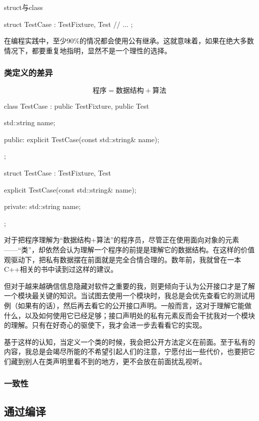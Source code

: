 \begin{content}
\begin{episode}{struct与class}
\begin{content}
\begin{c++}
struct TestCase : TestFixture, Test {
  // ...  
};
\end{c++}

在编程实践中，至少$90\%$的情况都会使用公有继承。这就意味着，如果在绝大多数情况下，都要重复地指明，显然不是一个理性的选择。

\subsubsection{类定义的差异}

\[\text{程序} = \text{数据结构} + \text{算法}\]

\begin{c++}
class TestCase : public TestFixture, public Test {
  std::string name;

public:
  explicit TestCase(const std::string& name);
};

struct TestCase : TestFixture, Test {
  explicit TestCase(const std::string& name);

private:
  std::string name;
};
\end{c++}

对于把程序理解为“数据结构+算法”的程序员，尽管正在使用面向对象的元素——“类”，却依然会认为理解一个程序的前提是理解它的数据结构。在这样的价值观驱动下，把私有数据摆在前面就是完全合情合理的。数年前，我就曾在一本C++相关的书中读到过这样的建议。

但对于越来越确信信息隐藏对软件之重要的我，则更倾向于认为公开接口才是了解一个模块最关键的知识。当试图去使用一个模块时，我总是会优先查看它的测试用例（如果有的话），然后再去看它的公开接口声明。一般而言，这对于理解它能做什么，以及如何使用它已经足够；接口声明处的私有元素反而会干扰我对一个模块的理解。只有在好奇心的驱使下，我才会进一步去看看它的实现。

基于这样的认知，当定义一个类的时候，我会把公开方法定义在前面。至于私有的内容，我总是会竭尽所能的不希望引起人们的注意，宁愿付出一些代价，也要把它们藏到别人在类声明里看不到的地方，更不会放在前面扰乱视听。

\subsubsection{一致性}

\end{content}
\end{episode}

\subsection{通过编译}


\end{content}
